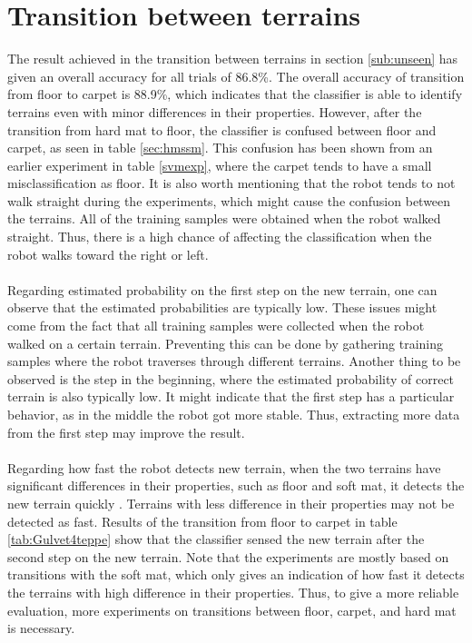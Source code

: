 \documentclass[USenglish]{ifimaster}  %
\begin{document}
\section{Transition between terrains}
The result achieved in the transition between terrains in section \ref{sub:unseen} has given an overall accuracy for all trials of 86.8\%. The overall accuracy of transition from floor to carpet is 88.9\%, which indicates that the classifier is able to identify terrains even with minor differences in their properties. However, after the transition from hard mat to floor, the classifier is confused between floor and carpet, as seen in table \ref{sec:hmssm}. This confusion has been shown from an earlier experiment in table \ref{svmexp}, where the carpet tends to have a small misclassification as floor. It is also worth mentioning that the robot tends to not walk straight during the experiments, which might cause the confusion between the terrains. All of the training samples were obtained when the robot walked straight. Thus, there is a high chance of affecting the classification when the robot walks toward the right or left. 
\\
\\
Regarding estimated probability on the first step on the new terrain, one can observe that the estimated probabilities are typically low. These issues might come from the fact that all training samples were collected when the robot walked on a certain terrain. Preventing this can be done by gathering training samples where the robot traverses through different terrains. Another thing to be observed is the step in the beginning, where the estimated probability of correct terrain is also typically low. It might indicate that the first step has a particular behavior, as in the middle the robot got more stable. Thus, extracting more data from the first step may improve the result.
\\
\\
Regarding how fast the robot detects new terrain, when the two terrains have significant differences in their properties, such as floor and soft mat, it detects the new terrain quickly . Terrains with less difference in their properties may not be detected as fast. Results of the transition from floor to carpet in table \ref{tab:Gulvet4teppe} show that the classifier sensed the new terrain after the second step on the new terrain. Note that the experiments are mostly based on transitions with the soft mat, which only gives an indication of how fast it detects the terrains with high difference in their properties. Thus, to give a more reliable evaluation, more experiments on transitions between floor, carpet, and hard mat is necessary.
	
\end{document}
